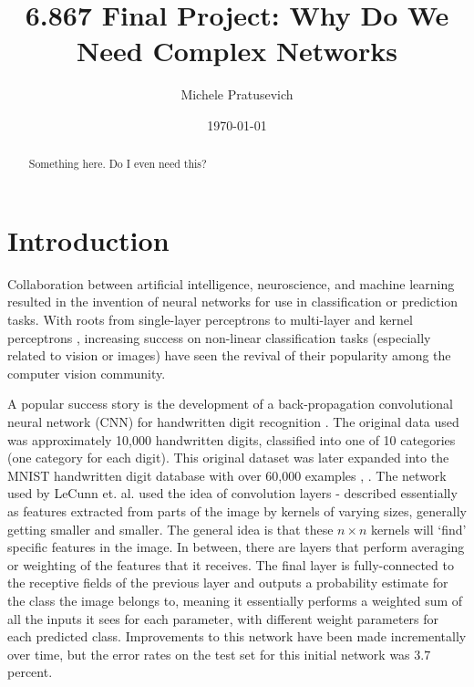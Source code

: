 \documentclass[10pt]{article}
\begin{document}
\title{6.867 Final Project: Why Do We Need Complex Networks}
\author{Michele Pratusevich}
\date{\today}
\maketitle

\begin{abstract}
Something here. Do I even need this?
\end{abstract}

\section{Introduction}

Collaboration between artificial intelligence, neuroscience, and machine learning resulted in the invention of neural networks for use in classification or prediction tasks. With roots from single-layer perceptrons \cite{rosenblatt_perceptron:_1958} to multi-layer and kernel perceptrons \cite{aizerman_theoretical_1964}, increasing success on non-linear classification tasks (especially related to vision or images) have seen the revival of their popularity among the computer vision community. 

A popular success story is the development of a back-propagation convolutional neural network (CNN) for handwritten digit recognition \cite{lecun_handwritten_1990}. The original data used was approximately 10,000 handwritten digits, classified into one of 10 categories (one category for each digit). This original dataset was later expanded into the MNIST handwritten digit database with over 60,000 examples \cite{lecun_gradient-based_1998}, \cite{li_deng_mnist_2012}. The network used by LeCunn et. al. used the idea of convolution layers - described essentially as features extracted from parts of the image by kernels of varying sizes, generally getting smaller and smaller. The general idea is that these $n \times n$ kernels will `find' specific features in the image. In between, there are layers that perform averaging or weighting of the features that it receives. The final layer is fully-connected to the receptive fields of the previous layer and outputs a probability estimate for the class the image belongs to, meaning it essentially performs a weighted sum of all the inputs it sees for each parameter, with different weight parameters for each predicted class. Improvements to this network have been made incrementally over time, but the error rates on the test set for this initial network was $3.7$ percent. 
\end{document}

